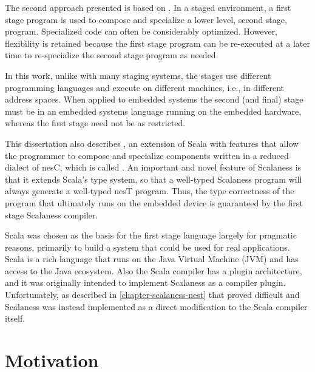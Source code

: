 The second approach presented is based on 
\cite{Taha-MetaML,Sheard-TemplateHaskell,Mainland-Flask-2008,FramedML}. In a staged environment,
a first stage program is used to compose and specialize a lower level, second stage, program.
Specialized code can often be considerably optimized. However, flexibility is retained because
the first stage program can be re-executed at a later time to re-specialize the second stage
program as needed.

In this work, unlike with many staging systems, the stages use different programming languages
and execute on different machines, i.e., in different address spaces. When applied to embedded
systems the second (and final) stage must be in an embedded systems language running on the
embedded hardware, whereas the first stage need not be as restricted.

This dissertation also describes  \cite{chapin-GPCE-2013}, an extension of
Scala \cite{PiS2} with features that allow the programmer to compose and specialize components
written in a reduced dialect of nesC, which is called . An important and novel
feature of Scalaness is that it extends Scala's type system, so that a well-typed Scalaness
program will always generate a well-typed nesT program. Thus, the type correctness of the
program that ultimately runs on the embedded device is guaranteed by the first stage Scalaness
compiler.

Scala was chosen as the basis for the first stage language largely for pragmatic reasons,
primarily to build a system that could be used for real applications. Scala is a rich language
that runs on the Java Virtual Machine (JVM) and has access to the Java ecosystem. Also the Scala
compiler has a plugin architecture, and it was originally intended to implement Scalaness as a
compiler plugin. Unfortunately, as described in \autoref{chapter-scalaness-nest} that proved
difficult and Scalaness was instead implemented as a direct modification to the Scala compiler
itself.

\section{Motivation}


